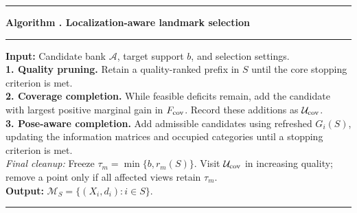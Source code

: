 \par\medskip
\noindent\begin{minipage}{\linewidth}
\label{alg:selection}
\hrule\smallskip
\textbf{Algorithm \theanygsalgorithm. Localization-aware landmark selection}
\smallskip\hrule\smallskip
\small
\textbf{Input:} Candidate bank $\mathcal A$, target support $b$, and selection settings.\\[2pt]
\textbf{1. Quality pruning.} Retain a quality-ranked prefix in $S$ until the core stopping criterion is met.\\[2pt]
\textbf{2. Coverage completion.} While feasible deficits remain, add the candidate with largest positive marginal gain in $F_{\rm cov}$. Record these additions as $\mathcal U_{\rm cov}$.\\[2pt]
\textbf{3. Pose-aware completion.} Add admissible candidates using refreshed $G_i(S)$, updating the information matrices and occupied categories until a stopping criterion is met.\\[2pt]
\hspace*{1em}\emph{Final cleanup:} Freeze $\tau_m=\min\{b,r_m(S)\}$. Visit $\mathcal U_{\rm cov}$ in increasing quality; remove a point only if all affected views retain $\tau_m$.\\[2pt]
\textbf{Output:} $\mathcal M_S=\{(X_i,d_i):i\in S\}$.
\smallskip\hrule
\end{minipage}
\par\medskip
